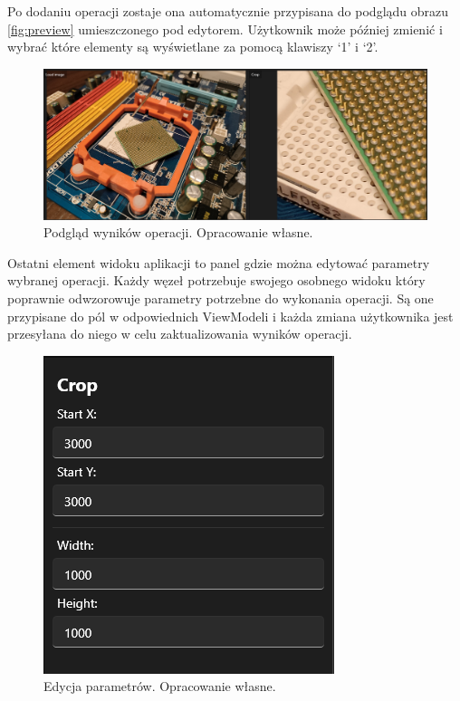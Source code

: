 Po dodaniu operacji zostaje ona automatycznie przypisana do podglądu obrazu \autoref{fig:preview} umieszczonego pod edytorem. Użytkownik może później zmienić i wybrać które elementy są wyświetlane za pomocą klawiszy `1' i `2'.

\begin{figure}[H]
    \centering
    \includegraphics[width=1\linewidth]{images/Picture16.png}
    \caption{Podgląd wyników operacji. Opracowanie własne.}
    \label{fig:preview}
\end{figure}

Ostatni element widoku aplikacji to panel gdzie można edytować parametry wybranej operacji. 
Każdy węzeł potrzebuje swojego osobnego widoku który poprawnie odwzorowuje parametry potrzebne do wykonania operacji. 
Są one przypisane do pól w odpowiednich ViewModeli i każda zmiana użytkownika jest przesyłana do niego w celu zaktualizowania wyników operacji.

\begin{figure}[H]
    \centering
    \includegraphics[width=0.6\linewidth]{images/Picture17.png}
    \caption{Edycja parametrów. Opracowanie własne.}
    \label{fig:params}
\end{figure}

